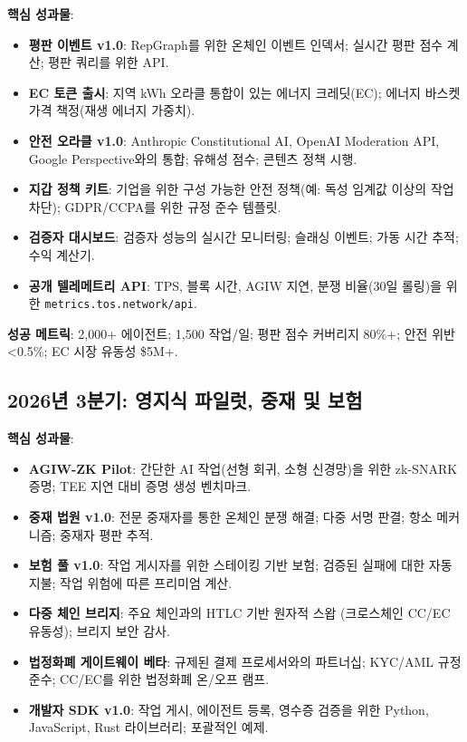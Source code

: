 \documentclass[11pt]{article}
\begin{document}
\textbf{핵심 성과물}:
\begin{itemize}[noitemsep]
  \item \textbf{평판 이벤트 v1.0}: RepGraph를 위한 온체인 이벤트 인덱서; 실시간 평판 점수 계산; 평판 쿼리를 위한 API.
  \item \textbf{EC 토큰 출시}: 지역 kWh 오라클 통합이 있는 에너지 크레딧(EC); 에너지 바스켓 가격 책정(재생 에너지 가중치).
  \item \textbf{안전 오라클 v1.0}: Anthropic Constitutional AI, OpenAI Moderation API, Google Perspective와의 통합; 유해성 점수; 콘텐츠 정책 시행.
  \item \textbf{지갑 정책 키트}: 기업을 위한 구성 가능한 안전 정책(예: 독성 임계값 이상의 작업 차단); GDPR/CCPA를 위한 규정 준수 템플릿.
  \item \textbf{검증자 대시보드}: 검증자 성능의 실시간 모니터링; 슬래싱 이벤트; 가동 시간 추적; 수익 계산기.
  \item \textbf{공개 텔레메트리 API}: TPS, 블록 시간, AGIW 지연, 분쟁 비율(30일 롤링)을 위한 \texttt{metrics.tos.network/api}.
\end{itemize}

\textbf{성공 메트릭}: 2,000+ 에이전트; 1,500 작업/일; 평판 점수 커버리지 80\%+; 안전 위반 <0.5\%; EC 시장 유동성 \$5M+.

\subsection{2026년 3분기: 영지식 파일럿, 중재 및 보험}

\textbf{핵심 성과물}:
\begin{itemize}[noitemsep]
  \item \textbf{AGIW-ZK Pilot}: 간단한 AI 작업(선형 회귀, 소형 신경망)을 위한 zk-SNARK 증명; TEE 지연 대비 증명 생성 벤치마크.
  \item \textbf{중재 법원 v1.0}: 전문 중재자를 통한 온체인 분쟁 해결; 다중 서명 판결; 항소 메커니즘; 중재자 평판 추적.
  \item \textbf{보험 풀 v1.0}: 작업 게시자를 위한 스테이킹 기반 보험; 검증된 실패에 대한 자동 지불; 작업 위험에 따른 프리미엄 계산.
  \item \textbf{다중 체인 브리지}: 주요 체인과의 HTLC 기반 원자적 스왑 (크로스체인 CC/EC 유동성); 브리지 보안 감사.
  \item \textbf{법정화폐 게이트웨이 베타}: 규제된 결제 프로세서와의 파트너십; KYC/AML 규정 준수; CC/EC를 위한 법정화폐 온/오프 램프.
  \item \textbf{개발자 SDK v1.0}: 작업 게시, 에이전트 등록, 영수증 검증을 위한 Python, JavaScript, Rust 라이브러리; 포괄적인 예제.
\end{itemize}
\end{document}
